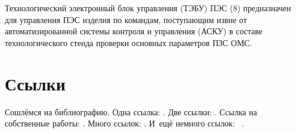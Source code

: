 Технологический электронный блок управления (ТЭБУ) ПЭС (8) предназначен для управления ПЭС изделия по командам, поступающим извне от автоматизированной системы контроля и управления (АСКУ) в составе технологического стенда проверки основных параметров ПЗС ОМС.

\section{Ссылки}\label{sec:ch1/sec2}

Сошлёмся на библиографию.
Одна ссылка: \cite[с.~54]{Sokolov}\cite[с.~36]{Gaidaenko}.
Две ссылки: \cite{Sokolov,Gaidaenko}.
Ссылка на собственные работы: \cite{vakbib1, confbib2}.
Много ссылок: %
\cite{Lermontov, Management, Borozda, Marketing, Constitution, FamilyCode,
    Gost.7.0.53, Razumovski, Lagkueva, Pokrovski, Methodology, Berestova,
    Kriger}%
%
.
И~ещё немного ссылок:~\cite{Article,Book,Booklet,Conference,Inbook,Incollection,Manual,Mastersthesis,
    Misc,Phdthesis,Proceedings,Techreport,Unpublished}
\cite{medvedev2006jelektronnye, CEAT:CEAT581, doi:10.1080/01932691.2010.513279,
    Gosele1999161,Li2007StressAnalysis, Shoji199895, test:eisner-sample,
    test:eisner-sample-shorted, AB_patent_Pomerantz_1968, iofis_patent1960}%
%
.

%

